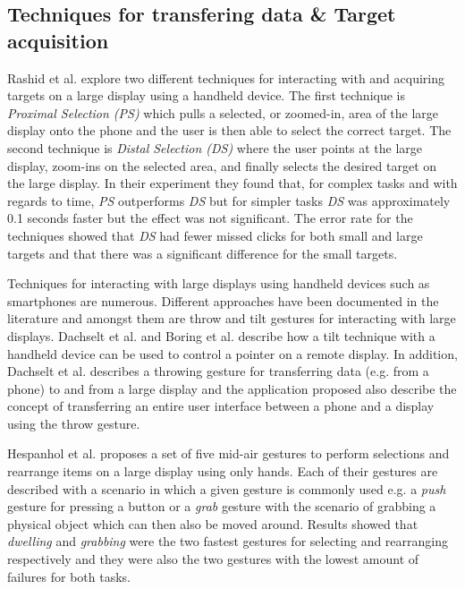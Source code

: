 \subsection{Techniques for transfering data \& Target acquisition} \label{sec:targetAcquisition}
Rashid et al. \cite{Rashid:2011} explore two different techniques for interacting with and acquiring targets on a large display using a handheld device.
The first technique is \emph{Proximal Selection (PS)} which pulls a selected, or zoomed-in, area of the large display onto the phone and the user is then able to select the correct target.
The second technique is \emph{Distal Selection (DS)} where the user points at the large display, zoom-ins on the selected area, and finally selects the desired target on the large display.
In their experiment they found that, for complex tasks and with regards to time, \emph{PS} outperforms \emph{DS} but for simpler tasks \emph{DS} was approximately 0.1 seconds faster but the effect was not significant.
The error rate for the techniques showed that \emph{DS} had fewer missed clicks for both small and large targets and that there was a significant difference for the small targets. 

Techniques for interacting with large displays using handheld devices such as smartphones are numerous.
Different approaches have been documented in the literature and amongst them are throw and tilt gestures for interacting with large displays.
Dachselt et al. \cite{Dachselt:2008} and Boring et al. \cite{Boring:2009} describe how a tilt technique with a handheld device can be used to control a pointer on a remote display.
In addition, Dachselt et al. describes a throwing gesture for transferring data (e.g. from a phone) to and from a large display and the application proposed also describe the concept of transferring an entire user interface between a phone and a display using the throw gesture.

Hespanhol et al. \cite{Hespanhol:2012} proposes a set of five mid-air gestures to perform selections and rearrange items on a large display using only hands.
Each of their gestures are described with a scenario in which a given gesture is commonly used e.g. a \emph{push} gesture for pressing a button or a \emph{grab} gesture with the scenario of grabbing a physical object which can then also be moved around.
Results showed that \emph{dwelling} and \emph{grabbing} were the two fastest gestures for selecting and rearranging respectively and they were also the two gestures with the lowest amount of failures for both tasks.

